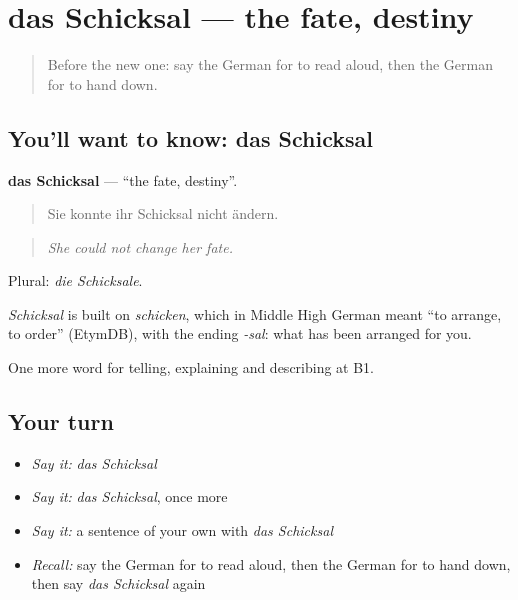 \section[das Schicksal]{das Schicksal — the fate, destiny}

\label{lesson:GE-C317-schicksal}



\begin{quote}
Before the new one: say the German for to read aloud, then the German for to hand down.
\end{quote}

\subsection*{You'll want to know: das Schicksal}
\textbf{das Schicksal} — \textquotedblleft{}the fate, destiny\textquotedblright{}.

\begin{quote}
Sie konnte ihr Schicksal nicht ändern.
\end{quote}

\begin{quote}
\emph{She could not change her fate.}
\end{quote}

Plural: \emph{die Schicksale}.

\begin{cousinweb}
\emph{Schicksal} is built on \emph{schicken}, which in Middle High German meant \textquotedblleft{}to arrange, to order\textquotedblright{} (EtymDB), with the ending \emph{-sal}: what has been arranged for you.
\end{cousinweb}

\begin{grammarlens}[title={What you've built}]
One more word for telling, explaining and describing at B1.
\end{grammarlens}

\subsection*{Your turn}
\begin{itemize}
\raggedright
  \item \emph{Say it:} \emph{das Schicksal}
  \item \emph{Say it:} \emph{das Schicksal}, once more
  \item \emph{Say it:} a sentence of your own with \emph{das Schicksal}
  \item \emph{Recall:} say the German for to read aloud, then the German for to hand down, then say \emph{das Schicksal} again
\end{itemize}

